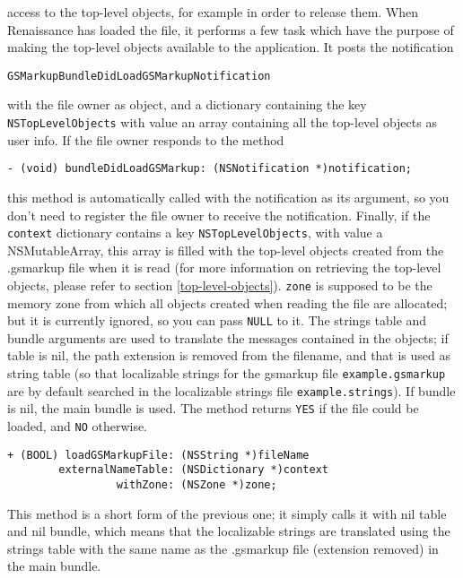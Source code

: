 access to the top-level objects, for example in order to release them.
When Renaissance has loaded the file, it performs a few task which
have the purpose of making the top-level objects available to the
application.  It posts the notification
\begin{verbatim}
GSMarkupBundleDidLoadGSMarkupNotification
\end{verbatim}
with the file owner as object, and a dictionary containing the key
\texttt{NSTopLevelObjects} with value an array containing all the 
top-level objects as user info.  If the file owner responds to the
method
\begin{verbatim}
- (void) bundleDidLoadGSMarkup: (NSNotification *)notification;
\end{verbatim}
this method is automatically called with the notification as its
argument, so you don't need to register the file owner to receive the
notification.  Finally, if the \texttt{context} dictionary contains a
key \texttt{NSTopLevelObjects}, with value a NSMutableArray, this
array is filled with the top-level objects created from the .gsmarkup
file when it is read (for more information on retrieving the top-level
objects, please refer to section \ref{top-level-objects}).
\texttt{zone} is supposed to be the memory zone from which all objects
created when reading the file are allocated; but it is currently
ignored, so you can pass \texttt{NULL} to it.  The strings table and
bundle arguments are used to translate the messages contained in the
objects; if table is nil, the path extension is removed from the
filename, and that is used as string table (so that localizable
strings for the gsmarkup file \texttt{example.gsmarkup} are by default
searched in the localizable strings file
\texttt{example.strings}).  If bundle is nil, the main bundle is used.
The method returns \texttt{YES} if the file could be loaded, and
\texttt{NO} otherwise.

\begin{verbatim}
+ (BOOL) loadGSMarkupFile: (NSString *)fileName
        externalNameTable: (NSDictionary *)context
                 withZone: (NSZone *)zone;
\end{verbatim}
This method is a short form of the previous one; it simply calls it
with nil table and nil bundle, which means that the localizable
strings are translated using the strings table with the same name as
the .gsmarkup file (extension removed) in the main bundle.

